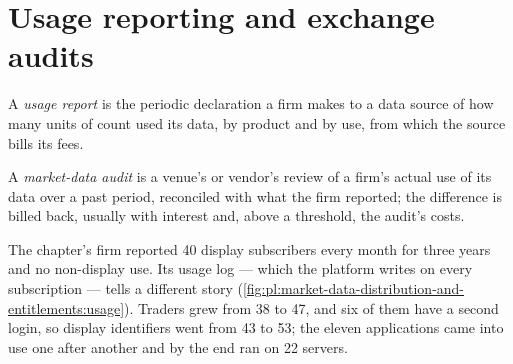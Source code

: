 \section{Usage reporting and exchange audits}

\begin{definition}\label{def:pl:market-data-distribution-and-entitlements:report}
A \emph{usage report} is the periodic declaration a firm makes to a data source of how many units of count used its data,
by product and by use, from which the source bills its fees.
\end{definition}

\begin{definition}\label{def:pl:market-data-distribution-and-entitlements:audit}
A \emph{market-data audit} is a venue's or vendor's review of a firm's actual use of its data over a past period,
reconciled with what the firm reported; the difference is billed back, usually with interest and, above a threshold, the audit's costs.
\end{definition}

The chapter's firm reported 40 display subscribers every month for three years and no non-display use. Its usage log --- which the platform
writes on every subscription --- tells a different story (\cref{fig:pl:market-data-distribution-and-entitlements:usage}). Traders grew from 38
to 47, and six of them have a second login, so display identifiers went from 43 to 53; the eleven applications came into use one after another
and by the end ran on 22 servers.

\label{lst:pl:market-data-distribution-and-entitlements:audit}

